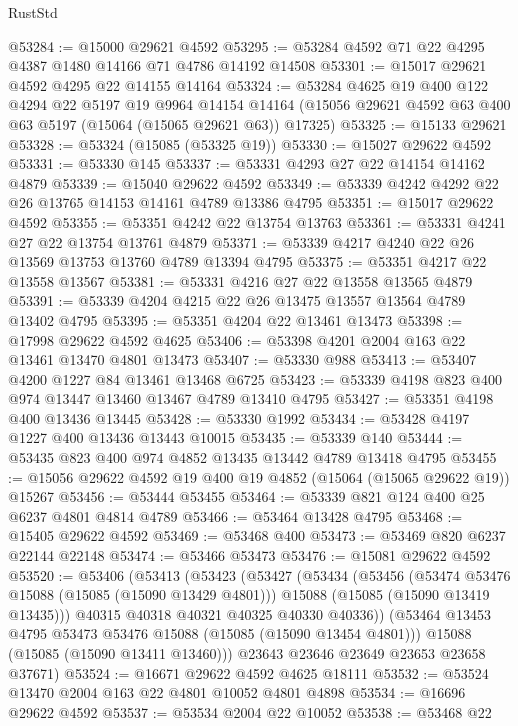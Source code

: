 \begin{lexlean}{RustStd}
\begin{coremodule}
@53284 := @15000 @29621 @4592
@53295 := @53284 @4592 @71 @22 @4295 @4387 @1480 @14166 @71 @4786 @14192 @14508
@53301 := @15017 @29621 @4592 @4295 @22 @14155 @14164
@53324 := @53284
    @4625
    @19
    @400
    @122
    @4294
    @22
    @5197
    @19
    @9964
    @14154
    @14164
    (@15056 @29621 @4592 @63 @400 @63 @5197 (@15064 (@15065 @29621 @63)) @17325)
@53325 := @15133 @29621
@53328 := @53324 (@15085 (@53325 @19))
@53330 := @15027 @29622 @4592
@53331 := @53330 @145
@53337 := @53331 @4293 @27 @22 @14154 @14162 @4879
@53339 := @15040 @29622 @4592
@53349 := @53339 @4242 @4292 @22 @26 @13765 @14153 @14161 @4789 @13386 @4795
@53351 := @15017 @29622 @4592
@53355 := @53351 @4242 @22 @13754 @13763
@53361 := @53331 @4241 @27 @22 @13754 @13761 @4879
@53371 := @53339 @4217 @4240 @22 @26 @13569 @13753 @13760 @4789 @13394 @4795
@53375 := @53351 @4217 @22 @13558 @13567
@53381 := @53331 @4216 @27 @22 @13558 @13565 @4879
@53391 := @53339 @4204 @4215 @22 @26 @13475 @13557 @13564 @4789 @13402 @4795
@53395 := @53351 @4204 @22 @13461 @13473
@53398 := @17998 @29622 @4592 @4625
@53406 := @53398 @4201 @2004 @163 @22 @13461 @13470 @4801 @13473
@53407 := @53330 @988
@53413 := @53407 @4200 @1227 @84 @13461 @13468 @6725
@53423 := @53339 @4198 @823 @400 @974 @13447 @13460 @13467 @4789 @13410 @4795
@53427 := @53351 @4198 @400 @13436 @13445
@53428 := @53330 @1992
@53434 := @53428 @4197 @1227 @400 @13436 @13443 @10015
@53435 := @53339 @140
@53444 := @53435 @823 @400 @974 @4852 @13435 @13442 @4789 @13418 @4795
@53455 := @15056 @29622 @4592 @19 @400 @19 @4852 (@15064 (@15065 @29622 @19)) @15267
@53456 := @53444 @53455
@53464 := @53339 @821 @124 @400 @25 @6237 @4801 @4814 @4789
@53466 := @53464 @13428 @4795
@53468 := @15405 @29622 @4592
@53469 := @53468 @400
@53473 := @53469 @820 @6237 @22144 @22148
@53474 := @53466 @53473
@53476 := @15081 @29622 @4592
@53520 := @53406
    (@53413
      (@53423
        (@53427
          (@53434
            (@53456
              (@53474 @53476 @15088 (@15085 (@15090 @13429 @4801)))
              @15088
              (@15085 (@15090 @13419 @13435)))
            @40315
            @40318
            @40321
            @40325
            @40330
            @40336))
        (@53464 @13453 @4795 @53473 @53476 @15088 (@15085 (@15090 @13454 @4801)))
        @15088
        (@15085 (@15090 @13411 @13460)))
      @23643
      @23646
      @23649
      @23653
      @23658
      @37671)
@53524 := @16671 @29622 @4592 @4625 @18111
@53532 := @53524 @13470 @2004 @163 @22 @4801 @10052 @4801 @4898
@53534 := @16696 @29622 @4592
@53537 := @53534 @2004 @22 @10052
@53538 := @53468 @22

\end{coremodule}
\end{lexlean}
